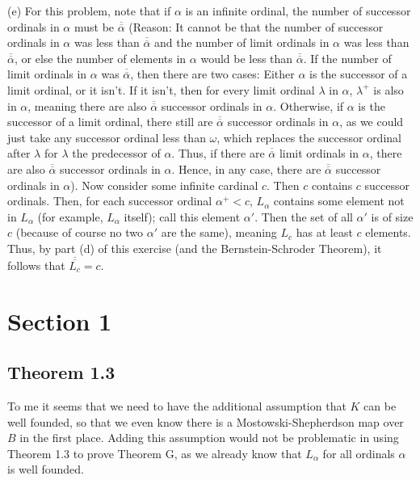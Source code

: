 \documentclass{article}
\theoremstyle{definition}
\begin{document}
(e)
For this problem, note that if $\alpha$ is an infinite ordinal, the number of successor ordinals in $\alpha$ must be 
$\overline{\overline{\alpha}}$ (Reason: It cannot be that the number of successor ordinals in $\alpha$ was less than $\overline{\overline{\alpha}}$ 
and the number of limit ordinals in $\alpha$ was less than $\overline{\overline{\alpha}}$, or else the number of elements in 
$\alpha$ would be less than $\overline{\overline{\alpha}}$. If the number of limit ordinals in $\alpha$ was $\overline{\overline{\alpha}}$, then there are two cases: Either 
$\alpha$ is the successor of a limit ordinal, or it isn't. If it isn't, then for every limit ordinal $\lambda$ in $\alpha$, $\lambda^+$ is also in $\alpha$, meaning 
there are also $\overline{\overline{\alpha}}$ successor ordinals in $\alpha$. Otherwise, if $\alpha$ is the successor of a limit ordinal, there still are 
$\overline{\overline{\alpha}}$ successor ordinals in $\alpha$, as we could just take any successor ordinal less than $\omega$, which replaces the successor ordinal 
after $\lambda$ for $\lambda$ the predecessor of $\alpha$. Thus, if there are $\overline{\overline{\alpha}}$ limit ordinals in $\alpha$, there are also
$\overline{\overline{\alpha}}$ successor ordinals in $\alpha$. Hence, in any case, there are $\overline{\overline{\alpha}}$ successor ordinals in $\alpha$). 
Now consider some infinite cardinal $c$. Then $c$ contains $c$ successor ordinals. Then, for each 
successor ordinal $\alpha^+<c$, $L_\alpha$ contains some element not in $L_\alpha$ (for example, $L_\alpha$ itself); call this element $\alpha'$. Then 
the set of all $\alpha'$ is of size $c$ (because of course no two $\alpha'$ are the same), meaning $L_c$ has at least $c$ elements. Thus, by part (d) of this 
exercise (and the Bernstein-Schroder Theorem), it follows that $\overline{\overline{L_c}}=c$. 

\section*{Section 1}

\subsection*{Theorem 1.3}
To me it seems that we need to have the additional assumption that $K$ can be well founded, so that we even know there
is a Mostowski-Shepherdson map over $B$ in the first place. Adding this assumption would not be problematic in 
using Theorem 1.3 to prove Theorem G, as we already know that $L_\alpha$ for all ordinals $\alpha$ is well founded.
\end{document}
